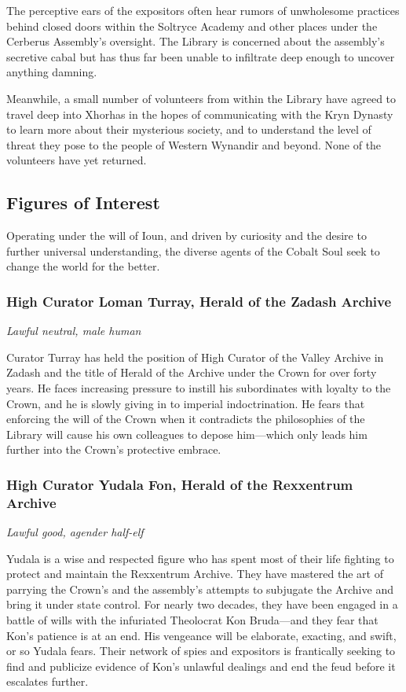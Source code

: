\documentclass[10pt,a4paper,twoside,bg=print,twocolumn,openany,nodeprecatedcode]{dndbook}
\begin{document}
The perceptive ears of the expositors often hear rumors of unwholesome practices behind closed doors within the Soltryce Academy and other places under the Cerberus Assembly's oversight. The Library is concerned about the assembly's secretive cabal but has thus far been unable to infiltrate deep enough to uncover anything damning.

Meanwhile, a small number of volunteers from within the Library have agreed to travel deep into Xhorhas in the hopes of communicating with the Kryn Dynasty to learn more about their mysterious society, and to understand the level of threat they pose to the people of Western Wynandir and beyond. None of the volunteers have yet returned.

\subsection{Figures of Interest}
Operating under the will of Ioun, and driven by curiosity and the desire to further universal understanding, the diverse agents of the Cobalt Soul seek to change the world for the better.

\subsubsection{High Curator Loman Turray, Herald of the Zadash Archive}
\textit{Lawful neutral, male human}

Curator Turray has held the position of High Curator of the Valley Archive in Zadash and the title of Herald of the Archive under the Crown for over forty years. He faces increasing pressure to instill his subordinates with loyalty to the Crown, and he is slowly giving in to imperial indoctrination. He fears that enforcing the will of the Crown when it contradicts the philosophies of the Library will cause his own colleagues to depose him—which only leads him further into the Crown's protective embrace.

\subsubsection{High Curator Yudala Fon, Herald of the Rexxentrum Archive}
\textit{Lawful good, agender half-elf}

Yudala is a wise and respected figure who has spent most of their life fighting to protect and maintain the Rexxentrum Archive. They have mastered the art of parrying the Crown's and the assembly's attempts to subjugate the Archive and bring it under state control. For nearly two decades, they have been engaged in a battle of wills with the infuriated Theolocrat Kon Bruda—and they fear that Kon's patience is at an end. His vengeance will be elaborate, exacting, and swift, or so Yudala fears. Their network of spies and expositors is frantically seeking to find and publicize evidence of Kon's unlawful dealings and end the feud before it escalates further.
\end{document}
